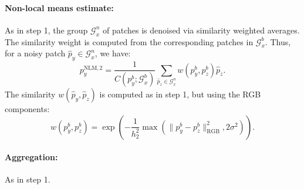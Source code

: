 \documentclass[a4paper,10pt]{article}
\begin{document}
\paragraph{Non-local means estimate:} As in step 1, the group $\mathcal G_x^n$ of patches
is denoised via similarity weighted averages. The similarity weight is computed
from the corresponding patches in $\mathcal G_x^b$. Thus, for a noisy patch
$\hat p_y\in \mathcal
G_x^n$, we have:
\[p_y^{\text{NLM},2} = \frac1{C(p^b_y; \mathcal G^b_x)}\sum_{\hat p_z\in\mathcal G^n_x} w(p^b_y, p^b_z)\hat p_z.\]
The similarity $w(\hat p_y, \hat p_z)$ is computed as in step 1, but using the
RGB components:
\[w(p^b_y, p^b_z) = \exp\left(-\frac1{h_2^2}\max(\|p^b_y - p^b_z\|_{\text{RGB}}^2, 2\sigma^2)\right).\]

\paragraph{Aggregation:} As in step 1.
\end{document}
